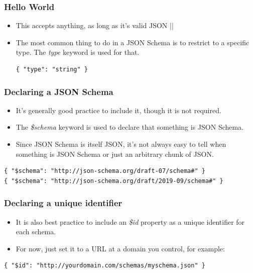 \documentclass{efd-lecture}
\begin{document}
\begin{frame}[fragile]
  \frametitle{Hello World}
  \begin{itemize}
    \item This accepts anything, as long as it’s valid JSON
      |{}|
    \item The most common thing to do in a JSON Schema is to restrict to a specific type. The \textit{\color{YellowOrange} type} keyword is used for that.
    \begin{verbatim}
{ "type": "string" }
    \end{verbatim}
  \end{itemize}
\end{frame}

\begin{frame}[fragile]
  \frametitle{Declaring a JSON Schema}
  \begin{itemize}
    \item It's generally good practice to include it, though it is not required.
    \item The \textit{\color{YellowOrange} \$schema} keyword is used to declare
        that something is JSON Schema.
    \item Since JSON Schema is itself JSON, it's not always easy to tell when
        something is JSON Schema or just an arbitrary chunk of JSON.
  \end{itemize}
  \begin{verbatim}
{ "$schema": "http://json-schema.org/draft-07/schema#" }
{ "$schema": "http://json-schema.org/draft/2019-09/schema#" }
  \end{verbatim}
\end{frame}

\begin{frame}[fragile]
  \frametitle{Declaring a unique identifier}
  \begin{itemize}
    \item It is also best practice to include an
      \textit{\color{YellowOrange} \$id} property as a unique identifier for
      each schema.
    \item For now, just set it to a URL at a domain you control, for example:
  \end{itemize}
  \begin{verbatim}
{ "$id": "http://yourdomain.com/schemas/myschema.json" }
  \end{verbatim}
\end{frame}
\end{document}
